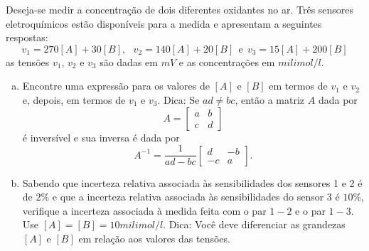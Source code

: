 \begin{exeresol} Deseja-se medir a concentração de dois diferentes oxidantes no ar. Três sensores eletroquímicos estão disponíveis para a medida e apresentam a seguintes respostas:
$$v_1= 270 [A] +  30 [B],~~~ v_2= 140 [A] +  20 [B] ~~ \text{e}~~ v_3= 15 [A] +  200 [B]$$
as tensões $v_1$, $v_2$ e $v_3$ são dadas em $mV$ e as concentrações em $milimol/l$.
\begin{enumerate}[a)]
\item Encontre uma expressão para os valores de $[A]$ e $[B]$ em termos de $v_1$ e $v_2$ e, depois, em termos de $v_1$ e $v_3$. Dica:
Se $ad\neq bc$, então a matriz $A$ dada por
$$A=\begin{bmatrix}a&b\\c&d\end{bmatrix}$$
é inversível e sua inversa é dada por
$$A^{-1}= \frac{1}{ad-bc} \left[\begin{array}{cc}d&-b\\-c&a\end{array}\right].$$

\item Sabendo que incerteza relativa associada às sensibilidades dos sensores 1 e 2 é de $2\%$ e que a incerteza relativa associada às sensibilidades do sensor 3 é $10\%$, verifique a incerteza associada à medida feita com o par $1-2$ e o par $1-3$. Use $[A]=[B]=10milimol/l$. Dica: Você deve diferenciar as grandezas $[A]$ e $[B]$ em relação aos valores das tensões.
\end{enumerate}
\end{exeresol}
